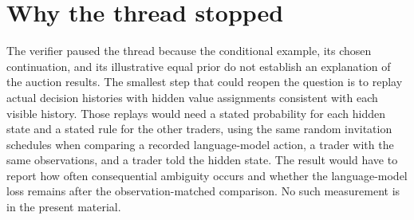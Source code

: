 \documentclass{article}
\begin{document}
\section{Why the thread stopped}

The verifier paused the thread because the conditional example, its chosen continuation, and its illustrative equal
prior do not establish an explanation of the auction results. The smallest step that could reopen the question is to
replay actual decision histories with hidden value assignments consistent with each visible history. Those replays
would need a stated probability for each hidden state and a stated rule for the other traders, using the same random
invitation schedules when comparing a recorded language-model action, a trader with the same observations, and a
trader told the hidden state. The result would have to report how often consequential ambiguity occurs and whether the
language-model loss remains after the observation-matched comparison. No such measurement is in the present material.



\end{document}

